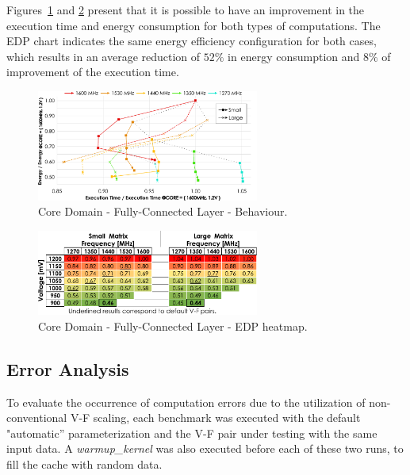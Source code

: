 Figures~\ref{fig:MatrixMult_behaviour} and \ref{fig:MatrixMult_EDP} present that it is possible to have an improvement in the execution time and energy consumption for both types of computations. The EDP chart indicates the same energy efficiency configuration for both cases, which results in an average reduction of $52\%$ in energy consumption and $8\%$ of improvement of the execution time.


\begin{figure}[htbp]
    \centering
        \includegraphics[width=0.65\textwidth]{Figures/Application To Deep Learning/MatrixMul_behaviour.pdf}
        \caption{Core Domain - Fully-Connected Layer - Behaviour.}
    \label{fig:MatrixMult_behaviour}
\end{figure}





\begin{figure}[htbp]
    \centering
        \includegraphics[width=0.65\textwidth]{Figures/Application To Deep Learning/MatrixMul_EDP.pdf}
        \caption{Core Domain - Fully-Connected Layer - EDP heatmap.}
    \label{fig:MatrixMult_EDP}
\end{figure}

\subsection{Error Analysis}

To evaluate the occurrence of computation errors due to the utilization of non-conventional V-F scaling, each benchmark was executed with the default "automatic'' parameterization and the V-F pair under testing with the same input data. A \textit{warmup\_kernel} was also executed before each of these two runs, to fill the cache with random data. 



